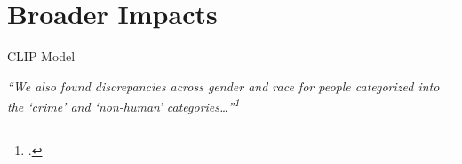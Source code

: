 \documentclass[aspectratio=169, 10pt]{beamer}
\theoremstyle{definition}
\begin{document}
\section{Broader Impacts}
\begin{frame}{CLIP Model}
  \begin{center}
    \it
    ``We also found discrepancies across gender and race for people
    categorized into the ‘crime’ and ‘non-human’
    categories\ldots''\footcite{clip}
  \end{center}
\end{frame}
{%
  }
\end{document}
